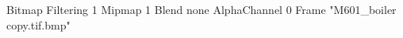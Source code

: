 {Bitmap
	{Filtering 1}
	{Mipmap 1}
	{Blend none}
	{AlphaChannel 0}
	{Frame "M601_boiler copy.tif.bmp"}
}
